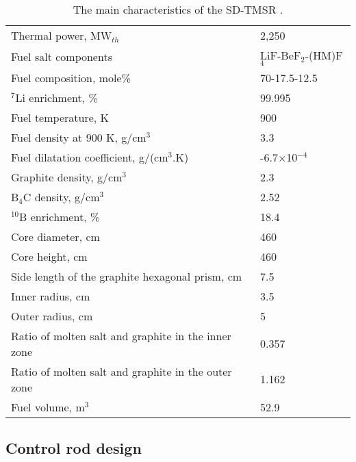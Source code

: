\begin{table}  %
	\caption{The main characteristics of the SD-TMSR \cite{li_optimization_2018}.}
	\vspace{0.1in}
	\begin{tabularx}{\textwidth}{l | l}
		\hline
		Thermal power, MW$_{th}$          				&  2,250  \\ 
		Fuel salt components                            & LiF-BeF$_2$-(\gls{HM})F$_4$ \\
		Fuel composition, mole\%                        & 70-17.5-12.5    \\
		$^7$Li enrichment, \%        				& 99.995   \\
		Fuel temperature, K 							& 900  \\
		Fuel density at 900 K, g/cm$^3$		  		& 3.3 \\
		Fuel dilatation coefficient, g/(cm$^3$$.$K)  &  -6.7$\times$10$^{-4}$ \\
		Graphite density, g/cm$^3$             	    & 2.3	\\  
		B$_4$C density, g/cm$^3$					& 2.52  \\
		$^{10}$B enrichment, \%						&  18.4  \\
		Core diameter, cm								& 460  \\
		Core height, cm									& 460  \\
		Side length of the graphite hexagonal prism, cm   & 7.5 \\
		Inner radius, cm							& 3.5  \\
		Outer radius, cm							& 5  \\
		Ratio of molten salt and graphite in the inner zone	&  0.357  \\
		Ratio of molten salt and graphite in the outer zone &  1.162  \\
		Fuel volume, m$^3$  &	52.9 \\
		\hline
	\end{tabularx}
	\label{tab:table1}
\end{table}


\subsection{Control rod design} \label{CRD}


